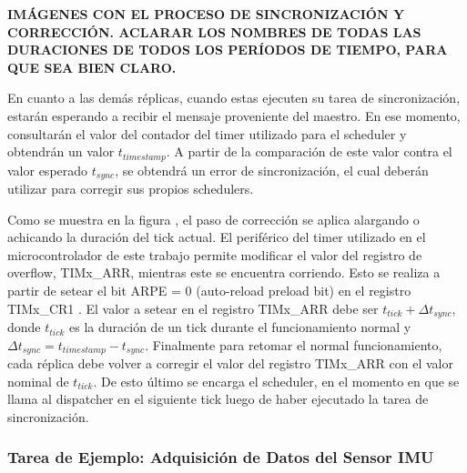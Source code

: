 {\Large \textbf{{\color{red} IMÁGENES CON EL PROCESO DE SINCRONIZACIÓN Y CORRECCIÓN. ACLARAR LOS NOMBRES DE TODAS LAS DURACIONES DE TODOS LOS PERÍODOS DE TIEMPO, PARA QUE SEA BIEN CLARO.}}}

En cuanto a las demás réplicas, cuando estas ejecuten su tarea de sincronización, estarán esperando a recibir el mensaje proveniente del maestro. En ese momento, consultarán el valor del contador del timer utilizado para el scheduler y obtendrán un valor $t_{timestamp}$. A partir de la comparación de este valor contra el valor esperado $t_{sync}$, se obtendrá un error de sincronización, el cual deberán utilizar para corregir sus propios schedulers.


Como se muestra en la figura , el paso de corrección se aplica alargando o achicando la duración del tick actual. El periférico del timer utilizado en el microcontrolador de este trabajo permite modificar el valor del registro de overflow, TIMx\_ARR, mientras este se encuentra corriendo. Esto se realiza a partir de setear el bit ARPE = 0 (auto-reload preload bit) en el registro TIMx\_CR1 \cite[p.~745]{RM0385}. El valor a setear en el registro TIMx\_ARR debe ser $t_{tick} + \Delta t_{sync}$, donde $t_{tick}$ es la duración de un tick durante el funcionamiento normal y $\Delta t_{sync} = t_{timestamp} - t_{sync}$.
Finalmente para retomar el normal funcionamiento, cada réplica debe volver a corregir el valor del registro TIMx\_ARR con el valor nominal de $t_{tick}$. De esto último se encarga el scheduler, en el momento en que se llama al dispatcher en el siguiente tick luego de haber ejecutado la tarea de sincronización.

\subsubsection{Tarea de Ejemplo: Adquisición de Datos del Sensor IMU}\label{sec:tarea_de_ejemplo_adquisicion_datos_IMU}


